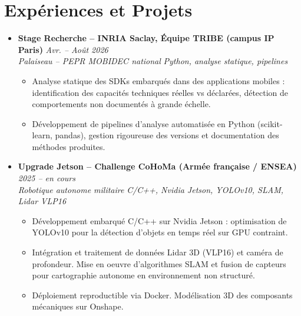 \documentclass[a4paper,11pt]{article}
\begin{document}
\section{Expériences et Projets}
\begin{itemize}[leftmargin=*, label={-}]

\item \textbf{Stage Recherche -- INRIA Saclay, Équipe TRIBE (campus IP Paris)} \hfill \textit{Avr. -- Août 2026} \\
\textit{Palaiseau -- PEPR MOBIDEC national} \hfill \textit{Python, analyse statique, pipelines}
\vspace{-2pt}
\begin{itemize}[leftmargin=0.4cm, nosep, label=\tiny$\bullet$]
    \item \small{Analyse statique des SDKs embarqués dans des applications mobiles : identification des capacités techniques réelles vs déclarées, détection de comportements non documentés à grande échelle.}
    \item \small{Développement de pipelines d'analyse automatisée en Python (scikit-learn, pandas), gestion rigoureuse des versions et documentation des méthodes produites.}
\end{itemize}
\vspace{3pt}

\item \textbf{Upgrade Jetson -- Challenge CoHoMa (Armée française / ENSEA)} \hfill \textit{2025 -- en cours} \\
\textit{Robotique autonome militaire} \hfill \textit{C/C++, Nvidia Jetson, YOLOv10, SLAM, Lidar VLP16}
\vspace{-2pt}
\begin{itemize}[leftmargin=0.4cm, nosep, label=\tiny$\bullet$]
    \item \small{Développement embarqué C/C++ sur Nvidia Jetson : optimisation de YOLOv10 pour la détection d'objets en temps réel sur GPU contraint.}
    \item \small{Intégration et traitement de données Lidar 3D (VLP16) et caméra de profondeur. Mise en oeuvre d'algorithmes SLAM et fusion de capteurs pour cartographie autonome en environnement non structuré.}
    \item \small{Déploiement reproductible via Docker. Modélisation 3D des composants mécaniques sur Onshape.}
\end{itemize}
\vspace{3pt}


\end{itemize}
\end{document}
